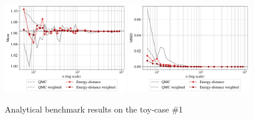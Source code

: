 \begin{figure}[!h]
\begin{center}
    \includegraphics[width=0.48\textwidth]{part2/figures/DCE/analytical_bench/Gaussian Mixture_convergence_ED.pdf}
    \includegraphics[width=0.48\textwidth]{part2/figures/DCE/analytical_bench/Gaussian Mixture_convergence_MMD_ED.pdf}\\
\end{center}
\caption{Analytical benchmark results on the toy-case \#1} \label{fig:toy-case1}
\end{figure}

